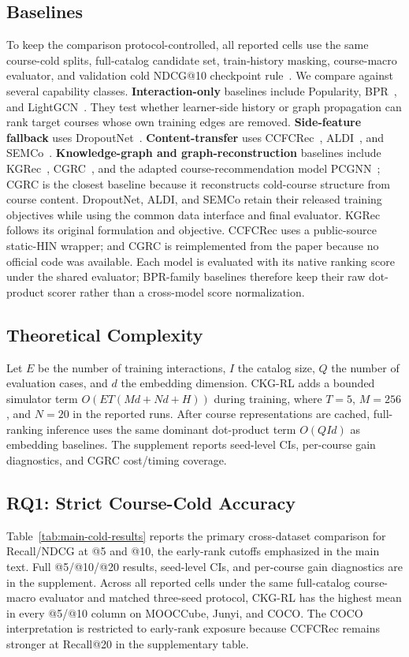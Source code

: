 \documentclass[letterpaper]{article}
\begin{document}
\subsection{Baselines}
To keep the comparison protocol-controlled, all reported cells use the same course-cold splits, full-catalog candidate set, train-history masking, course-macro evaluator, and validation cold NDCG@10 checkpoint rule~\cite{sun2020rigorous,hidasi2023flaws}. We compare against several capability classes. \textbf{Interaction-only} baselines include Popularity, BPR~\cite{rendle2009bpr}, and LightGCN~\cite{he2020lightgcn}. They test whether learner-side history or graph propagation can rank target courses whose own training edges are removed. \textbf{Side-feature fallback} uses DropoutNet~\cite{volkovs2017dropoutnet}. \textbf{Content-transfer} uses CCFCRec~\cite{zhou2023ccfcrec}, ALDI~\cite{huang2023aldi}, and SEMCo~\cite{meehan2026semco}. \textbf{Knowledge-graph and graph-reconstruction} baselines include KGRec~\cite{yang2023knowledge}, CGRC~\cite{kim2024cgrc}, and the adapted course-recommendation model PCGNN~\cite{sun2024pcgnn}; CGRC is the closest baseline because it reconstructs cold-course structure from course content. DropoutNet, ALDI, and SEMCo retain their released training objectives while using the common data interface and final evaluator. KGRec follows its original formulation and objective. CCFCRec uses a public-source static-HIN wrapper; and CGRC is reimplemented from the paper because no official code was available. Each model is evaluated with its native ranking score under the shared evaluator; BPR-family baselines therefore keep their raw dot-product scorer rather than a cross-model score normalization.

\subsection{Theoretical Complexity}
Let \(E\) be the number of training interactions, \(I\) the catalog size, \(Q\) the number of evaluation cases, and \(d\) the embedding dimension. CKG-RL adds a bounded simulator term \(O(E T(Md+Nd+H))\) during training, where \(T=5\), \(M=256\), and \(N=20\) in the reported runs. After course representations are cached, full-ranking inference uses the same dominant dot-product term \(O(QId)\) as embedding baselines. The supplement reports seed-level CIs, per-course gain diagnostics, and CGRC cost/timing coverage.

\subsection{RQ1: Strict Course-Cold Accuracy}
Table~\ref{tab:main-cold-results} reports the primary cross-dataset comparison for Recall/NDCG at @5 and @10, the early-rank cutoffs emphasized in the main text. Full @5/@10/@20 results, seed-level CIs, and per-course gain diagnostics are in the supplement. Across all reported cells under the same full-catalog course-macro evaluator and matched three-seed protocol, CKG-RL has the highest mean in every @5/@10 column on MOOCCube, Junyi, and COCO. The COCO interpretation is restricted to early-rank exposure because CCFCRec remains stronger at Recall@20 in the supplementary table.
\end{document}
